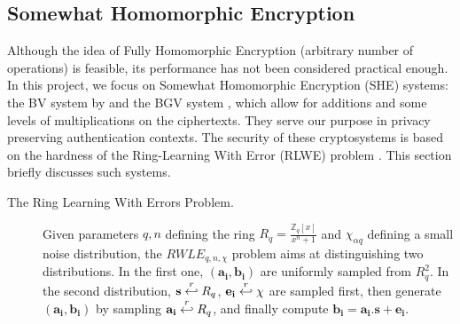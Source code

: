 \subsection{Somewhat Homomorphic Encryption}
Although the idea of Fully Homomorphic Encryption (arbitrary
number of operations) is feasible, its performance has not been considered
practical enough. In this project, we focus on Somewhat Homomorphic
Encryption (SHE) systems: the BV system by \cite{brakerski2011fully} and the BGV
system \cite{brakerski2014leveled}, which allow for additions and some levels of
multiplications on the ciphertexts. They serve our purpose in
privacy preserving authentication contexts. The security of these cryptosystems
is based on the hardness of the Ring-Learning With Error (RLWE) problem
\cite{lyubashevsky2010ideal}. This section briefly discusses such systems.
\begin{description}
\item[The Ring Learning With Errors Problem.]
  \begin{definition}
    [RWLE] Given parameters $q,n$ defining the ring
    \(R_{q} = \frac{\mathbb{Z}_{q}[x]}{x^{n} + 1} \) and 
    \(\chi_{\alpha q}\) defining a small noise distribution, the
    $RWLE_{q,n,\chi}$ problem aims at distinguishing two distributions. In the
    first one, $(\mathbf{a_i},\mathbf{b_i})$ are uniformly sampled from
    $R_q^2$.  In the second distribution,
    $\mathbf{s} \stackrel{r}{\hookleftarrow} R_q$, $\mathbf{e_i} \stackrel{r}{\hookleftarrow} \chi$ are sampled first, then
    generate $(\mathbf{a_i},\mathbf{b_i})$ by sampling
    $\mathbf{a_i} \stackrel{r}{\hookleftarrow} R_q$, and finally compute
    $\mathbf{b_i} = \mathbf{a_i}.\mathbf{s} + \mathbf{e_i}$.
  \end{definition}


\end{description}
